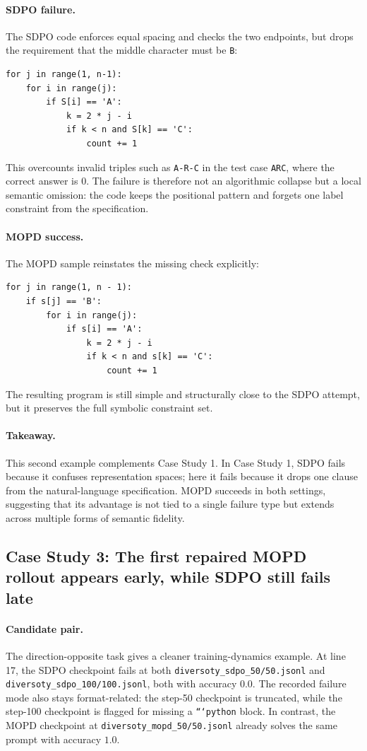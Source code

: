 \paragraph{SDPO failure.}
The SDPO code enforces equal spacing and checks the two endpoints, but drops the
requirement that the middle character must be \texttt{B}:
\begin{verbatim}
for j in range(1, n-1):
    for i in range(j):
        if S[i] == 'A':
            k = 2 * j - i
            if k < n and S[k] == 'C':
                count += 1
\end{verbatim}
This overcounts invalid triples such as \texttt{A-R-C} in the test case
\texttt{ARC}, where the correct answer is $0$.
The failure is therefore not an algorithmic collapse but a local semantic
omission: the code keeps the positional pattern and forgets one label
constraint from the specification.

\paragraph{MOPD success.}
The MOPD sample reinstates the missing check explicitly:
\begin{verbatim}
for j in range(1, n - 1):
    if s[j] == 'B':
        for i in range(j):
            if s[i] == 'A':
                k = 2 * j - i
                if k < n and s[k] == 'C':
                    count += 1
\end{verbatim}
The resulting program is still simple and structurally close to the SDPO
attempt, but it preserves the full symbolic constraint set.

\paragraph{Takeaway.}
This second example complements Case Study 1.
In Case Study 1, SDPO fails because it confuses representation spaces; here it
fails because it drops one clause from the natural-language specification.
MOPD succeeds in both settings, suggesting that its advantage is not tied to a
single failure type but extends across multiple forms of semantic fidelity.

\subsection{Case Study 3: The first repaired MOPD rollout appears early, while SDPO still fails late}

\paragraph{Candidate pair.}
The direction-opposite task gives a cleaner training-dynamics example.
At line 17, the SDPO checkpoint fails at both
\texttt{diversoty\_sdpo\_50/50.jsonl} and
\texttt{diversoty\_sdpo\_100/100.jsonl}, both with accuracy $0.0$.
The recorded failure mode also stays format-related:
the step-50 checkpoint is truncated, while the step-100 checkpoint is flagged
for missing a \texttt{```python} block.
In contrast, the MOPD checkpoint at
\texttt{diversoty\_mopd\_50/50.jsonl} already solves the same prompt with
accuracy $1.0$.

